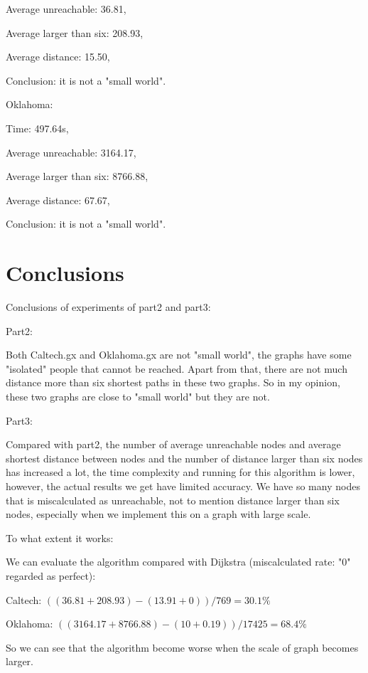 \documentclass{article}
\begin{document}
           Average unreachable: 36.81,

           Average larger than six: 208.93,

           Average distance: 15.50,

           Conclusion: it is not a "small world".

  Oklahoma: 
             
            Time: 497.64s, 

            Average unreachable: 3164.17,

            Average larger than six: 8766.88,

            Average distance: 67.67,

            Conclusion: it is not a "small world".

\section{Conclusions}
\label{sec:conclusions}
Conclusions of experiments of part2 and part3:

Part2:

Both Caltech.gx and Oklahoma.gx are not "small world", the graphs have some "isolated" people that
cannot be reached. Apart from that, there are not much distance more than six shortest paths in these
two graphs. So in my opinion, these two graphs are close to "small world" but they are not.

Part3:

Compared with part2, the number of average unreachable nodes and average shortest distance between nodes and 
the number of distance larger than six nodes has increased a lot,
the time complexity and running for this algorithm is lower, however, 
the actual results we get have limited accuracy. We have so many nodes that is miscalculated as unreachable, 
not to mention distance larger than six nodes, especially when we implement this on a graph with large scale.

To what extent it works: 

We can evaluate the algorithm compared with Dijkstra (miscalculated rate: "0" regarded as perfect):

Caltech: $((36.81+208.93)-(13.91+0)) / 769 = 30.1\%$

Oklahoma: $((3164.17+8766.88)-(10+0.19)) / 17425 = 68.4\%$

So we can see that the algorithm become worse when the scale of graph becomes larger.
\end{document}
